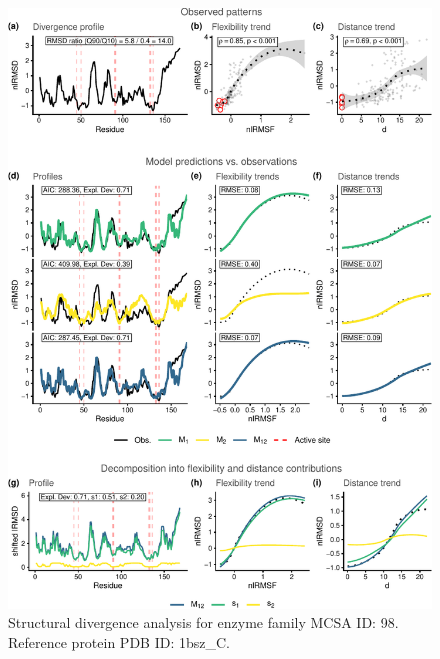 \documentclass[
]{article}
\begin{document}
\clearpage
\begin{figure}[H]
\centering


\begin{center}\includegraphics{supplementary_material_files/figure-latex/generate_figures-4} \end{center}

\caption{Structural divergence analysis for enzyme family MCSA ID: 98. Reference protein PDB ID: 1bsz\_C.}
\end{figure}
\end{document}
